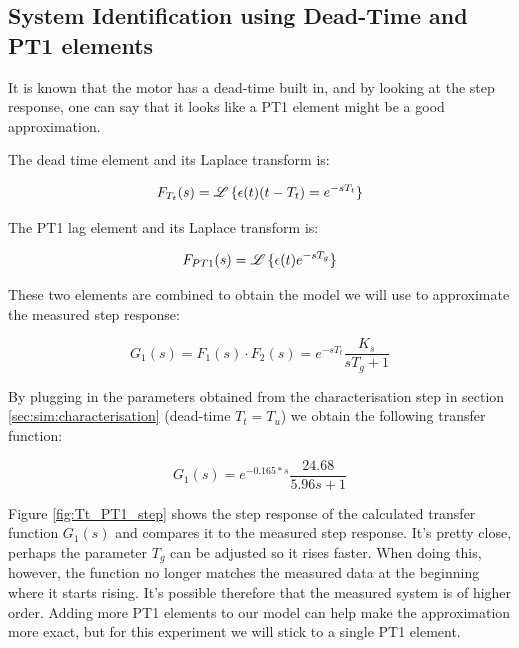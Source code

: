 \subsection{System Identification using Dead-Time and PT1 elements}
\label{sec:ident_Tt_PT1}

It  is  known  that the motor has a dead-time built in, and by looking at  the
step  response, one can say that it looks like a PT1 element might be  a  good
approximation.

The dead time element and its Laplace transform is:

\begin{equation}
    F_{T_t}(s) = \operatorname{\mathscr{L}}{\{\epsilon(t)(t-T_t)} = e^{-sT_t}\}
\end{equation}

The PT1 lag element and its Laplace transform is:

\begin{equation}
    F_{PT1}(s) = \operatorname{\mathscr{L}}{\{\epsilon(t)e^{-sT_g}}\}
\end{equation}

These two elements are combined to obtain the model we will use to approximate
the measured step response:

\begin{equation}
    G_1(s) = F_1(s) \cdot F_2(s) = e^{-sT_t} \frac{K_s}{sT_g+1}
\end{equation}

By  plugging  in  the  parameters  obtained  from the characterisation step in
section  \ref{sec:sim:characterisation}  (dead-time  $T_t=T_u$)  we obtain the
following transfer function:

\begin{equation}
    G_1(s) = e^{-0.165*s}\frac{24.68}{5.96s + 1}
\end{equation}

Figure  \ref{fig:Tt_PT1_step}  shows  the  step  response  of  the  calculated
transfer function $G_1(s)$ and compares it to the measured step response. It's
pretty  close, perhaps the parameter $T_g$ can be adjusted so it rises faster.
When doing this, however, the function no longer matches  the measured data at
the  beginning  where  it  starts  rising.  It's  possible therefore that  the
measured system  is of higher order. Adding more PT1 elements to our model can
help make the approximation more  exact, but for this experiment we will stick
to a single PT1 element.

